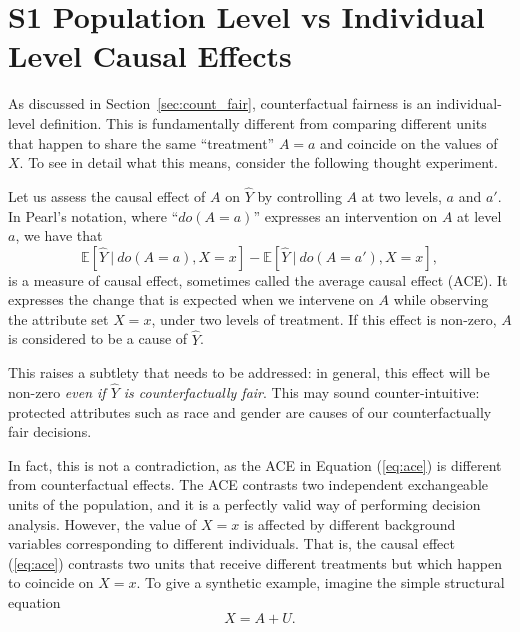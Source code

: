 

\section*{S1 Population Level vs Individual Level Causal Effects}
\label{sec:individual}

As discussed in Section~\ref{sec:count_fair}, counterfactual fairness
is an individual-level definition. This is fundamentally different
from comparing different units that happen to share the same
“treatment” $A = a$ and coincide on the values of $X$. To see in
detail what this means, consider the following thought experiment.

Let us assess the causal effect of $A$ on $\hat Y$ by controlling
$A$ at two levels, $a$ and $a'$. In Pearl's notation, where ``$do(A = a)$''
expresses an intervention on $A$ at level $a$, we have that
\begin{equation}
\label{eq:ace}
\mathbb{E}[\hat Y\ |\ do(A = a), X = x] - \mathbb{E}[\hat Y\ |\ do(A = a'), X = x],
\end{equation}
is a measure of causal effect, sometimes called the average causal
effect (ACE). It expresses the change that is expected when we
intervene on $A$ while observing the attribute set $X = x$, under two
levels of treatment. If this effect is non-zero, $A$ is considered to
be a cause of $\hat Y$.

This raises a subtlety that needs to be addressed: in general, this
effect will be non-zero {\it even if $\hat Y$ is counterfactually
  fair}. This may sound counter-intuitive: protected attributes such
as race and gender are causes of our counterfactually fair decisions.

In fact, this is not a contradiction, as the ACE in Equation
(\ref{eq:ace}) is different from counterfactual effects. The ACE
contrasts two independent exchangeable units of the population, and it
is a perfectly valid way of performing decision analysis. However, the
value of $X = x$ is affected by different background variables
corresponding to different individuals. That is, the causal effect
(\ref{eq:ace}) contrasts two units that receive different treatments
but which happen to coincide on $X = x$. To give a synthetic example,
imagine the simple structural equation
\[
X = A + U.
\]

